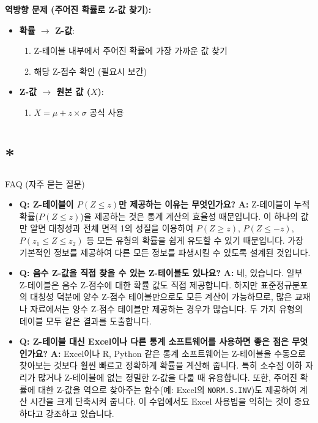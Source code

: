 \documentclass[11pt,a4paper]{article}
\theoremstyle{definition}
\newcommand{\newsection}[1]{\newpage\section{#1}}
\begin{document}
\begin{summarybox}
\textbf{역방향 문제 (주어진 확률로 Z-값 찾기):}
\begin{itemize}
    \item \textbf{확률 $\rightarrow$ Z-값}:
        \begin{enumerate}
            \item Z-테이블 내부에서 주어진 확률에 가장 가까운 값 찾기
            \item 해당 Z-점수 확인 (필요시 보간)
        \end{enumerate}
    \item \textbf{Z-값 $\rightarrow$ 원본 값 ($X$)}:
        \begin{enumerate}
            \item $X = \mu + z \times \sigma$ 공식 사용
        \end{enumerate}
\end{itemize}
\end{summarybox}

\newsection*{FAQ (자주 묻는 질문)}

\begin{itemize}
    \item \textbf{Q: Z-테이블이 $P(Z \le z)$만 제공하는 이유는 무엇인가요?}
    \textbf{A:} Z-테이블이 누적 확률($P(Z \le z)$)을 제공하는 것은 통계 계산의 효율성 때문입니다. 이 하나의 값만 알면 대칭성과 전체 면적 1의 성질을 이용하여 $P(Z \ge z)$, $P(Z \le -z)$, $P(z_1 \le Z \le z_2)$ 등 모든 유형의 확률을 쉽게 유도할 수 있기 때문입니다. 가장 기본적인 정보를 제공하여 다른 모든 정보를 파생시킬 수 있도록 설계된 것입니다.

    \item \textbf{Q: 음수 Z-값을 직접 찾을 수 있는 Z-테이블도 있나요?}
    \textbf{A:} 네, 있습니다. 일부 Z-테이블은 음수 Z-점수에 대한 확률 값도 직접 제공합니다. 하지만 표준정규분포의 대칭성 덕분에 양수 Z-점수 테이블만으로도 모든 계산이 가능하므로, 많은 교재나 자료에서는 양수 Z-점수 테이블만 제공하는 경우가 많습니다. 두 가지 유형의 테이블 모두 같은 결과를 도출합니다.

    \item \textbf{Q: Z-테이블 대신 Excel이나 다른 통계 소프트웨어를 사용하면 좋은 점은 무엇인가요?}
    \textbf{A:} Excel이나 R, Python 같은 통계 소프트웨어는 Z-테이블을 수동으로 찾아보는 것보다 훨씬 빠르고 정확하게 확률을 계산해 줍니다. 특히 소수점 이하 자리가 많거나 Z-테이블에 없는 정밀한 Z-값을 다룰 때 유용합니다. 또한, 주어진 확률에 대한 Z-값을 역으로 찾아주는 함수(예: Excel의 \texttt{NORM.S.INV})도 제공하여 계산 시간을 크게 단축시켜 줍니다. 이 수업에서도 Excel 사용법을 익히는 것이 중요하다고 강조하고 있습니다.
\end{itemize}
\end{document}
